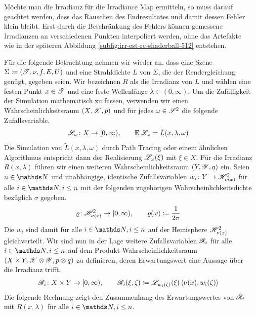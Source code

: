 		Möchte man die Irradianz für die Irradiance Map ermitteln, so muss darauf geachtet werden, dass das Rauschen des Endresultates und damit dessen Fehler klein bleibt.
		Erst durch die Beschränkung des Fehlers können gemessene Irradianzen an verschiedenen Punkten interpoliert werden, ohne das Artefakte wie in der späteren Abbildung \ref{subfig:irr-est-rc-shaderball-512} entstehen.

		Für die folgende Betrachtung nehmen wir wieder an, dass eine Szene $\Sigma\coloneqq(\mathscr{T},\nu,f,E,U)$ und eine Strahldichte $L$ von $\Sigma$, die der Rendergleichung genügt, gegeben seien.
		Wir bezeichnen $R$ als die Irradianz von $L$ und wählen eine festen Punkt $x\in\mathscr{T}$ und eine feste Wellenlänge $\lambda\in(0,\infty)$.
		Um die Zufälligkeit der Simulation mathematisch zu fassen, verwenden wir einen Wahrscheinlichkeitsraum $(X,\mathscr{X},p)$ und für jedes $\omega\in\mathscr{S}^{2}$ die folgende Zufallsvariable.
		\[
			\mathscr{L}_\omega\colon X\to[0,\infty),\qquad \operatorname{\mathbb{E}}\mathscr{L}_\omega = \tilde{L}(x,\lambda,\omega)
		\]
		Die Simulation von $\tilde{L}(x,\lambda,\omega)$ durch Path Tracing oder einem ähnlichen Algorithmus entspricht dann der Realisierung $\mathscr{L}_\omega(\xi)$ mit $\xi\in X$.
		Für die Irradianz $R(x,\lambda)$ führen wir einen weiteren Wahrscheinlichkeitsraum $(Y,\mathscr{Y},q)$ ein.
		Seien $n\in\SN$ und unabhängige, identische Zufallsvariablen $w_i\colon Y\to\mathscr{H}^{2}_{\nu(x)}$ für alle $i\in\SN,i\leq n$ mit der folgenden zugehörigen Wahrscheinlichkeitsdichte bezüglich $\sigma$ gegeben.
		\[
			\varrho\colon\mathscr{H}^{2}_{\nu(x)}\to[0,\infty),\qquad \varrho(\omega)\coloneqq\frac{1}{2\pi}
		\]
		Die $w_i$ sind damit für alle $i\in\SN,i\leq n$ auf der Hemisphere $\mathscr{H}^{2}_{\nu(x)}$ gleichverteilt.
		Wir sind nun in der Lage weitere Zufallsvariablen $\mathscr{R}_i$ für alle $i\in\SN,i\leq n$ auf dem Produkt-Wahrscheinlichkeitsraum $(X\times Y,\mathscr{X}\otimes\mathscr{Y}, p\otimes q)$ zu definieren, deren Erwartungswert eine Aussage über die Irradianz trifft.
		\[
			\mathscr{R}_i\colon X\times Y\to[0,\infty),\qquad \mathscr{R}_i(\xi,\zeta)\coloneqq \mathscr{L}_{w_i(\zeta)}(\xi) \left\langle \nu(x),w_i(\zeta) \right\rangle
		\]
		Die folgende Rechnung zeigt den Zusammenhang des Erwartungswertes von $\mathscr{R}_i$ mit $R(x,\lambda)$ für alle $i\in\SN,i\leq n$.
